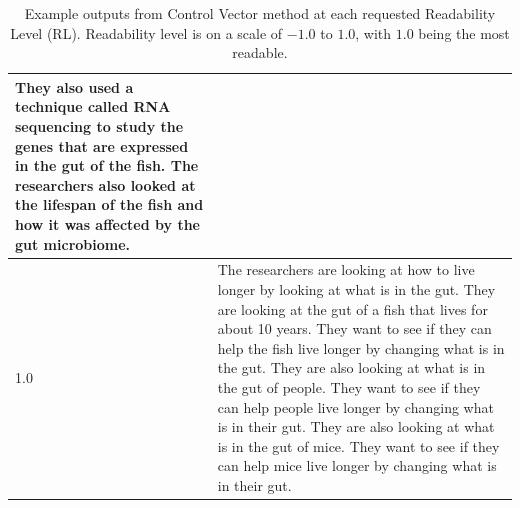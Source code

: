 \begin{table}[]
\begin{tabular}{l|p{}}
They also used a technique called RNA sequencing to study the genes that are expressed in the gut of the fish. The researchers also looked at the lifespan of the fish and how it was affected by the gut microbiome.\\ \hline
1.0 & The researchers are looking at how to live longer by looking at what is in the gut.  They are looking at the gut of a fish that lives for about 10 years.  They want to see if they can help the fish live longer by changing what is in the gut.  They are also looking at what is in the gut of people.  They want to see if they can help people live longer by changing what is in their gut.  They are also looking at what is in the gut of mice.   They want to see if they can help mice live longer by changing what is in their gut. \\ \hline
\end{tabular}
\caption{Example outputs from Control Vector method at each requested Readability Level (RL). Readability level is on a scale of $-1.0$ to $1.0$, with $1.0$ being the most readable.}\label{tab:cv-ex-outputs}
\end{table}

